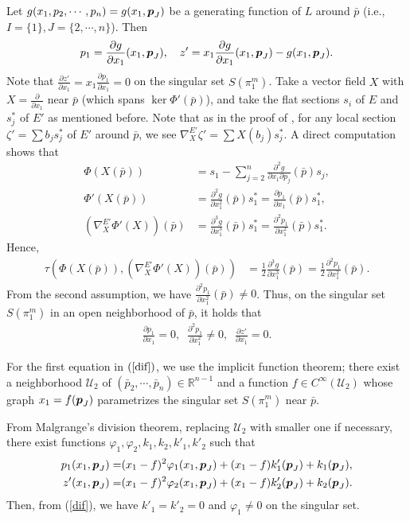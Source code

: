 \documentclass[10pt]{amsart}
\newcommand{\U}{\mathcal{U}}
\newcommand{\R}{\mathbb{R}}
\def\rd{\partial}
\def\bp{\mbox{\boldmath $p$}}
\begin{document}
Let $g(x_1, p_2,\cdots,p_{n})=g(x_1, \bp_J)$ be a generating function of $L$ around $\bar{p}$ (i.e., $I=\{1\}, J=\{2, \cdots, n\}$). Then  
\begin{equation}\label{pz_gen}
p_1=\frac{\rd g}{\rd x_1}(x_1, \bp_J), \quad 
z'= x_1\frac{\rd g}{\rd x_1}(x_1, \bp_J) - g(x_1, \bp_J). 
\end{equation}
Note that $\frac{\rd z'}{\rd x_1}=x_1\frac{\rd p_1}{\rd x_1}=0$ on the singular set $S(\pi^m_1)$.
Take a vector field $X$ with $X=\frac{\rd}{\rd x_1}$ near $\bar{p}$ (which spans $\ker\Phi'(\bar{p})$), 
and take the flat sections $s_i$ of $E$ and $s^*_j$ of $E'$ as mentioned before. 
Note that as in the proof of \cite[Lem.3.22]{NT}, 
for any local section $\zeta'=\sum b_j s_j^*$ of $E'$ around $\bar{p}$, we see $\nabla_X^{E'}\zeta'=\sum X(b_j) s_j^*$. 
A direct computation shows that 
\begin{align*}
\Phi(X(\bar{p})) &=s_1 - \sum_{j=2}^{n}\frac{\rd^2 g}{\rd x_1\rd p_j}(\bar{p})s_j,\\
\Phi'(X(\bar{p})) &= \frac{\rd^2 g}{\rd x_1^2}(\bar{p})s^*_1 = \frac{\rd p_1}{\rd x_1}(\bar{p})s^*_1,\\
(\nabla^{E'}_{X}\Phi'(X))(\bar{p}) &= \frac{\rd^3 g}{\rd x_1^3}(\bar{p})s^*_1 = \frac{\rd^2 p_1}{\rd x_1^2}(\bar{p})s^*_1. 
\end{align*}
Hence, 
\begin{align}\label{tau_x}
\tau(\Phi(X(\bar{p})), (\nabla^{E'}_{X}\Phi'(X))(\bar{p})) &= \frac{1}{2}\frac{\rd^3 g}{\rd x_1^3}(\bar{p})
=\frac{1}{2}\frac{\rd^2 p_1}{\rd x_1^2}(\bar{p}).
\end{align}
From the second assumption, we have $\frac{\rd^2 p_1}{\rd x_1^2}(\bar{p})\neq 0$. 
Thus,  on the singular set $S(\pi^m_1)$ in an open neighborhood of $\bar{p}$, it holds that 
\begin{align}\label{dif}
\frac{\rd p_1}{\rd x_1}=0,\;\;
\frac{\rd^2 p_1}{\rd x_1^2} \neq 0, \;\;
\frac{\rd z'}{\rd x_1} = 0.  
\end{align}

For the first equation in $(\ref{dif})$, we use the implicit function theorem; 
there exist a neighborhood $\U_2$ of $(\bar{p}_2, \cdots, \bar{p}_n)\in \R^{n-1}$
and a function $f\in C^\infty(\U_2)$ whose graph $x_1=f(\bp_J)$ parametrizes   
the singular set $S(\pi^m_1)$ near $\bar{p}$. 

From Malgrange's division theorem, replacing $\U_2$ with smaller one if necessary, there exist functions $\varphi_1, \varphi_2, k_1, k_2, k'_1, k'_2$ such that 
\begin{align*}
p_1(x_1, \bp_J) = &(x_1-f)^2\varphi_1(x_1, \bp_J)+ (x_1-f)k'_1(\bp_J) + k_1(\bp_J),\\
z'(x_1, \bp_J) = &(x_1-f)^2\varphi_2(x_1, \bp_J)+ (x_1-f)k'_2(\bp_J) + k_2(\bp_J).
\end{align*}
Then, from (\ref{dif}), we have $k'_1=k'_2=0$ and $\varphi_1\neq 0$ on the singular set. 
\end{document}
